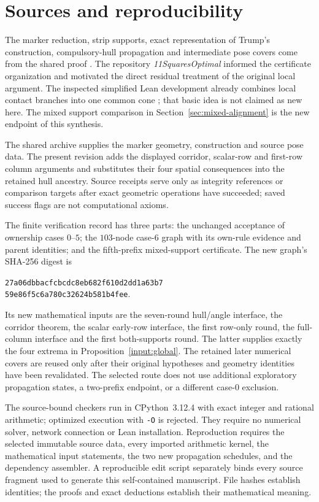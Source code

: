 \documentclass[11pt]{article}
\begin{document}
\section{Sources and reproducibility}\label{sec:reproducibility}
The marker reduction, strip supports, exact representation of Trump's
construction, compulsory-hull propagation and intermediate pose covers
come from the shared proof \cite{shared}. The repository
\emph{11SquaresOptimal} \cite{repository} informed the certificate
organization and motivated the direct residual treatment of the original
local argument.
The inspected simplified Lean development already combines local contact
branches into one common cone \cite{formalized}; that basic idea is not
claimed as new here. The mixed support comparison in
Section~\ref{sec:mixed-alignment} is the new endpoint of this synthesis.

The shared archive supplies the marker geometry, construction and source
pose data. The present revision adds the displayed corridor, scalar-row
and first-row column arguments and substitutes their four spatial
consequences into the retained hull ancestry. Source receipts serve only
as integrity references or comparison targets after exact geometric
operations have succeeded; saved success flags are not computational axioms.

The finite verification record has three parts: the unchanged acceptance
of ownership cases $0$--$5$; the $103$-node case-$6$ graph with its
own-rule evidence and parent identities; and the fifth-prefix mixed-support
certificate. The new graph's SHA-256 digest is
\begin{center}\small\texttt{27a06dbbacfcbcdc8eb682f610d2dd1a63b7}\\
\texttt{59e86f5c6a780c32624b581b4fee}.\end{center}
Its new mathematical inputs are the seven-round hull/angle interface,
the corridor theorem, the scalar early-row interface, the first row-only
round, the full-column interface and the first both-supports round.
The latter supplies exactly the four extrema in
Proposition~\ref{input:global}. The retained later numerical covers are
reused only after their original hypotheses and geometry identities have
been revalidated. The selected route does not use additional exploratory
propagation states, a two-prefix endpoint, or a different case-$0$ exclusion.

The source-bound checkers run in CPython~3.12.4 with exact integer and
rational arithmetic; optimized execution with \texttt{-O} is rejected.
They require no numerical solver, network connection or Lean installation.
Reproduction requires the selected immutable source data, every imported
arithmetic kernel, the mathematical input statements, the two new
propagation schedules, and the dependency assembler. A reproducible edit
script separately binds every source fragment used to generate this
self-contained manuscript. File hashes establish identities; the proofs
and exact deductions establish their mathematical meaning.
\end{document}

